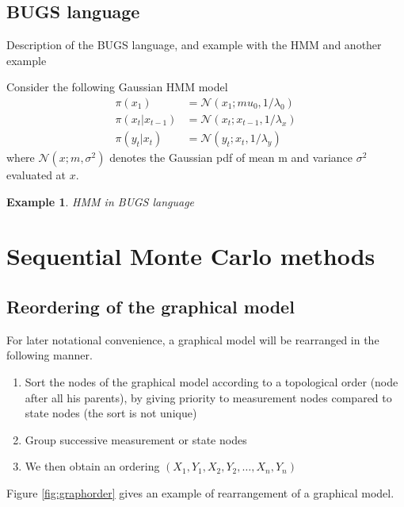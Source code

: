 \documentclass[article,shortnames]{jss}
\newtheorem{example}[theorem]{Example}
\newcommand{\Norm}{\mathcal{N}}
\begin{document}
\subsection{BUGS language}

Description of the BUGS language, and example with the HMM and another example

Consider the following Gaussian HMM model
\begin{align}
\pi(x_1)&=\Norm (x_1;mu_0,1/\lambda_0)\\
\pi(x_t|x_{t-1})&=\Norm (x_t;x_{t-1},1/\lambda_x)\\
\pi(y_t|x_{t})&=\Norm (y_t;x_{t},1/\lambda_y)
\end{align}
where $\Norm(x;m,\sigma^2)$ denotes the Gaussian pdf of mean m and variance $\sigma^2$ evaluated at $x$.


\begin{example}{HMM in BUGS language}
\end{example}





\section{Sequential Monte Carlo methods}
\label{sec:SMC}
\subsection{Reordering of the graphical model}
For later notational convenience, a graphical model will be rearranged in the following manner.
\begin{enumerate}
\item Sort the nodes of the graphical model according to a topological order (node after all his parents), by giving priority to measurement nodes compared to state nodes (the sort is not unique)
\item Group successive measurement or state nodes
\item We then obtain an ordering $(X_1,Y_1,X_2,Y_2,\ldots,X_n,Y_n)$
\end{enumerate}
Figure \ref{fig:graphorder} gives an example of rearrangement of a graphical model.
\end{document}
